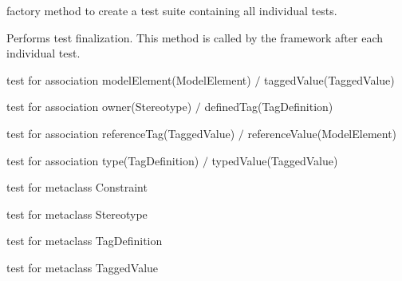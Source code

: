 \begin{desc}factory method to create a test suite containing all
 individual tests.
\end{desc}

\begin{desc}Performs test finalization.
 This method is called by the framework after each individual test.
\end{desc}

\begin{desc}test for association
 modelElement(ModelElement) $/$ taggedValue(TaggedValue)
\end{desc}

\begin{desc}test for association
 owner(Stereotype) $/$ definedTag(TagDefinition)
\end{desc}

\begin{desc}test for association
 referenceTag(TaggedValue) $/$ referenceValue(ModelElement)
\end{desc}

\begin{desc}test for association
 type(TagDefinition) $/$ typedValue(TaggedValue)
\end{desc}

\begin{desc}test for metaclass Constraint
\end{desc}

\begin{desc}test for metaclass Stereotype
\end{desc}

\begin{desc}test for metaclass TagDefinition
\end{desc}

\begin{desc}test for metaclass TaggedValue
\end{desc}

